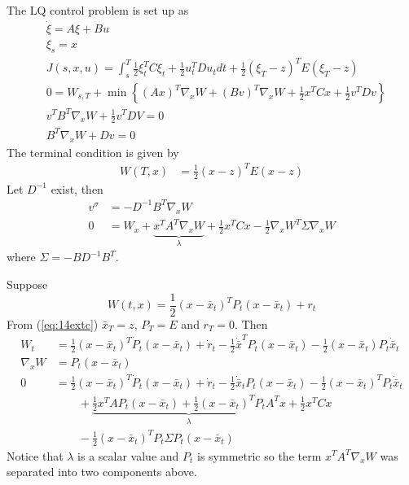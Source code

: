 \begin{example}
\label{ex:14lq}
The LQ control problem is set up as
\begin{align*}
&\dot{\xi} = A\xi+Bu \\
&\xi_s = x \\
&J(s,x,u) = \int_s^T\frac{1}{2}\xi_t^TC\xi_t + \frac{1}{2}u_t^TDu_tdt + \frac{1}{2}(\xi_T-z)^TE(\xi_T-z) \\
&0 = W_{s,T} + \min\left\lbrace (Ax)^T\nabla_xW + (Bv)^T\nabla_xW + \frac{1}{2}x^TCx + \frac{1}{2}v^TDv \right\rbrace \\
&v^TB^T\nabla_xW + \frac{1}{2}v^TDV = 0 \\
&B^T\nabla_xW + Dv = 0
\end{align*}
The terminal condition is given by
\begin{align}
\label{eq:14extc}
W(T,x) &= \frac{1}{2}(x-z)^TE(x-z)
\end{align}
Let $D^{-1}$ exist, then
\begin{align*}
v^\sigma &= -D^{-1}B^T\nabla_xW \\
0 &= W_x+\underbrace{x^TA^T\nabla_xW}_{\lambda} + \frac{1}{2}x^TCx - \frac{1}{2}\nabla_xW^T\Sigma\nabla_xW
\end{align*}
where $\Sigma = -BD^{-1}B^T$.

Suppose
$$W(t,x) = \frac{1}{2}(x-\bar{x}_t)^TP_t(x-\bar{x}_t) + r_t$$
From (\ref{eq:14extc}) $\bar{x}_T = z$, $P_T=E$ and $r_T=0$. Then
\begin{align*}
W_t &= \frac{1}{2}(x-\bar{x}_t)^T\dot{P}_t(x-\bar{x}_t)+\dot{r}_t - \frac{1}{2}\dot{\bar{x}}^TP_t(x-\bar{x}_t) - \frac{1}{2}(x-\bar{x}_t)P_t\dot{\bar{x}}_t \\
\nabla_xW &= P_t(x-\bar{x}_t) \\
0 &= \frac{1}{2}(x-\bar{x}_t)^T\dot{P}_t(x-\bar{x}_t) + \dot{r}_t - \frac{1}{2}\dot{\bar{x}}_tP_t(x-\bar{x}_t) - \frac{1}{2}(x-\bar{x}_t)^TP_t\dot{\bar{x}}_t \\
&\qquad + \underbrace{\frac{1}{2}x^TAP_t(x-\bar{x}_t) + \frac{1}{2}(x-\bar{x}_t)^TP_tA^Tx}_{\lambda} + \frac{1}{2}x^TCx \\
&\qquad - \frac{1}{2}(x-\bar{x}_t)^TP_t\Sigma P_t(x-\bar{x}_t)
\end{align*}
Notice that $\lambda$ is a scalar value and $P_t$ is symmetric so the term $x^TA^T\nabla_xW$ was separated into two components above.


\end{example}
